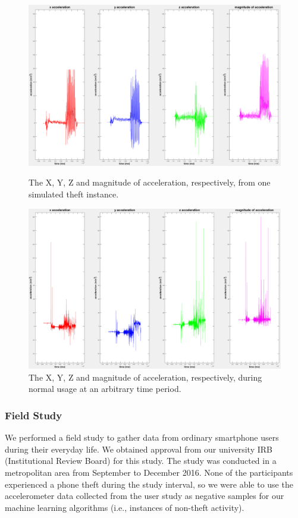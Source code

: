 \begin{figure}[t]
\includegraphics[width=1.0\columnwidth]{pos_acc_separated.png}
\caption{The X, Y, Z and magnitude of acceleration, respectively, from one simulated theft instance.}
\label{fig:simtheft}
\includegraphics[width=1.0\columnwidth]{neg_acc_separated.png}
\caption{The X, Y, Z and magnitude of acceleration, respectively, during normal usage at an arbitrary time period.}
\end{figure}




\subsubsection{Field Study}
We performed a field study to gather data from ordinary smartphone users
during their everyday life.
We obtained approval from our university IRB (Institutional Review Board) for this study. 
The study was conducted in a metropolitan area from September to December 2016.
None of the participants experienced a phone theft during the study interval,
so we were able to use the accelerometer data collected from the user study as negative samples for our machine learning algorithms (i.e., instances of non-theft activity).

